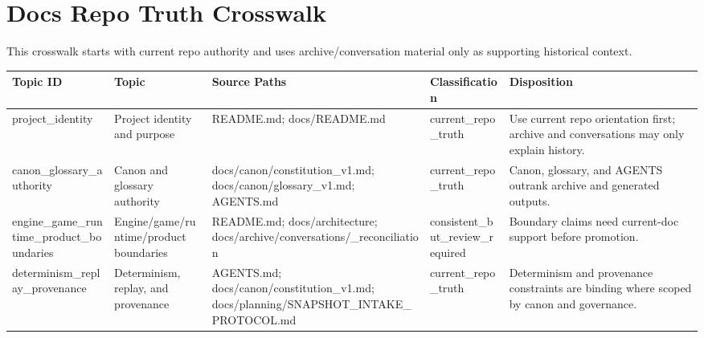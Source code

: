\documentclass[10.5pt,a4paper,openany]{book}
\newcommand{\toprule}{\hline}
\newcommand{\midrule}{\hline}
\begin{document}
\section{Docs Repo Truth Crosswalk}

This crosswalk starts with current repo authority and uses archive/\allowbreak{}conversation material only as supporting historical context.\allowbreak{}


\begin{center}
{\small\renewcommand{\arraystretch}{1.18}
\begin{tabularx}{\linewidth}{@{}>{\raggedright\arraybackslash}X >{\raggedright\arraybackslash}X >{\raggedright\arraybackslash}X >{\raggedright\arraybackslash}X >{\raggedright\arraybackslash}X@{}}
\toprule
\textbf{Topic ID} & \textbf{Topic} & \textbf{Source Paths} & \textbf{Classification} & \textbf{Disposition} \\
\midrule
project\_\allowbreak{}identity & Project identity and purpose & README.\allowbreak{}md; docs/\allowbreak{}README.\allowbreak{}md & current\_\allowbreak{}repo\_\allowbreak{}truth & Use current repo orientation first; archive and conversations may only explain history.\allowbreak{} \\
canon\_\allowbreak{}glossary\_\allowbreak{}authority & Canon and glossary authority & docs/\allowbreak{}canon/\allowbreak{}constitution\_\allowbreak{}v1.\allowbreak{}md; docs/\allowbreak{}canon/\allowbreak{}glossary\_\allowbreak{}v1.\allowbreak{}md; AGENTS.\allowbreak{}md & current\_\allowbreak{}repo\_\allowbreak{}truth & Canon, glossary, and AGENTS outrank archive and generated outputs.\allowbreak{} \\
engine\_\allowbreak{}game\_\allowbreak{}runtime\_\allowbreak{}product\_\allowbreak{}boundaries & Engine/\allowbreak{}game/\allowbreak{}runtime/\allowbreak{}product boundaries & README.\allowbreak{}md; docs/\allowbreak{}architecture; docs/\allowbreak{}archive/\allowbreak{}conversations/\allowbreak{}\_\allowbreak{}reconciliation & consistent\_\allowbreak{}but\_\allowbreak{}review\_\allowbreak{}required & Boundary claims need current-\allowbreak{}doc support before promotion.\allowbreak{} \\
determinism\_\allowbreak{}replay\_\allowbreak{}provenance & Determinism, replay, and provenance & AGENTS.\allowbreak{}md; docs/\allowbreak{}canon/\allowbreak{}constitution\_\allowbreak{}v1.\allowbreak{}md; docs/\allowbreak{}planning/\allowbreak{}SNAPSHOT\_\allowbreak{}INTAKE\_\allowbreak{}PROTOCOL.\allowbreak{}md & current\_\allowbreak{}repo\_\allowbreak{}truth & Determinism and provenance constraints are binding where scoped by canon and governance.\allowbreak{} \\

\end{tabularx}}
\end{center}
\end{document}
